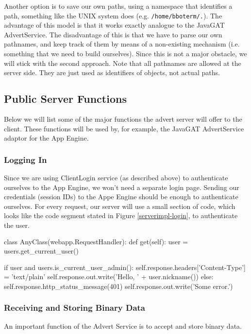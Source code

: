 Another option is to save our own paths, using a namespace that identifies a
path, something like the UNIX system does (e.g. \texttt{/home/bboterm/.}). The
advantage of this model is that it works exactly analogue to the JavaGAT
AdvertService. The disadvantage of this is that we have to parse our own
pathnames, and keep track of them by means of a non-existing mechanism (i.e.
something that we need to build ourselves). Since this is not a major obstacle,
we will stick with the second approach. Note that all pathnames are allowed at
the server side. They are just used as identifiers of objects, not actual paths.

\subsection{Public Server Functions}
Below we will list some of the major functions the advert server will offer to
the client. These functions will be used by, for example, the JavaGAT
AdvertService adaptor for the App Engine.

\subsubsection{Logging In}
Since we are using ClientLogin service (as described above) to authenticate
ourselves to the App Engine, we won't need a separate login page. Sending our
credentials (session IDs) to the Appe Engine should be enough to authenticate
ourselves. For every request, our server will use a small section of code, which
looks like the code segment stated in Figure \ref{serverimpl-login}, to
authenticate the user.

\begin{figure*}[ht] %
\begin{center}
\begin{code}
class AnyClass(webapp.RequestHandler):
  def get(self):
    user = users.get_current_user()

    if user and users.is_current_user_admin():
      self.response.headers['Content-Type'] = 'text/plain'
      self.response.out.write('Hello, ' + user.nickname())
    else:
      self.response.http_status_message(401)
      self.response.out.write('Some error.')
\end{code}
\caption{A MetaData Object.\label{serverimpl-login}}
\end{center}
\end{figure*}
      
\subsubsection{Receiving and Storing Binary Data}
An important function of the Advert Service is to accept and store binary data.

